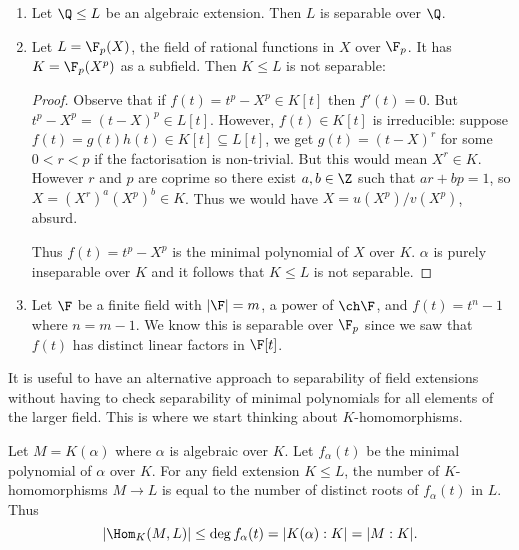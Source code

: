 \documentclass[a4paper]{article}
\begin{document}
\begin{eg}\leavevmode
  \begin{enumerate}
  \item Let \(\Q \leq L\) be an algebraic extension. Then \(L\) is separable over \(\Q\).
  \item Let \(L = \F_p(X)\), the field of rational functions in \(X\) over \(\F_p\). It has \(K = \F_p(X^p)\) as a subfield. Then \(K \leq L\) is not separable:
    \begin{proof}
      Observe that if \(f(t) = t^p - X^p \in K[t]\) then \(f'(t) = 0\). But \(t^p - X^p = (t - X)^p \in L[t]\). However, \(f(t) \in K[t]\) is irreducible: suppose \(f(t) = g(t)h(t) \in K[t] \subseteq L[t]\), we get \(g(t) = (t - X)^r\) for some \(0 < r < p\) if the factorisation is non-trivial. But this would mean \(X^r \in K\). However \(r\) and \(p\) are coprime so there exist \(a, b \in \Z\) such that \(ar + bp = 1\), so \(X = (X^r)^a (X^p)^b \in K\). Thus we would have \(X = u(X^p)/v(X^p)\), absurd.

      Thus \(f(t) = t^p - X^p\) is the minimal polynomial of \(X\) over \(K\). \(\alpha\) is purely inseparable over \(K\) and it follows that \(K \leq L\) is not separable.
    \end{proof}
  \item Let \(\F\) be a finite field with \(|\F| = m\), a power of \(\ch \F\), and \(f(t) = t^n - 1\) where \(n = m - 1\). We know this is separable over \(\F_p\) since we saw that \(f(t)\) has distinct linear factors in \(\F[t]\).
  \end{enumerate}
\end{eg}

\begin{remark}
  It is useful to have an alternative approach to separability of field extensions without having to check separability of minimal polynomials for all elements of the larger field. This is where we start thinking about \(K\)-homomorphisms.
\end{remark}

\begin{lemma}
  \label{lem:homomorphism of algebraic extension}
  Let \(M = K(\alpha)\) where \(\alpha\) is algebraic over \(K\). Let \(f_\alpha(t)\) be the minimal polynomial of \(\alpha\) over \(K\). For any field extension \(K \leq L\), the number of \(K\)-homomorphisms \(M \to L\) is equal to the number of distinct roots of \(f_\alpha(t)\) in \(L\). Thus
  \[
    |\Hom_K(M, L)| \leq \deg f_\alpha(t) = |K(\alpha):K| = |M:K|.
  \]
\end{lemma}
\end{document}
